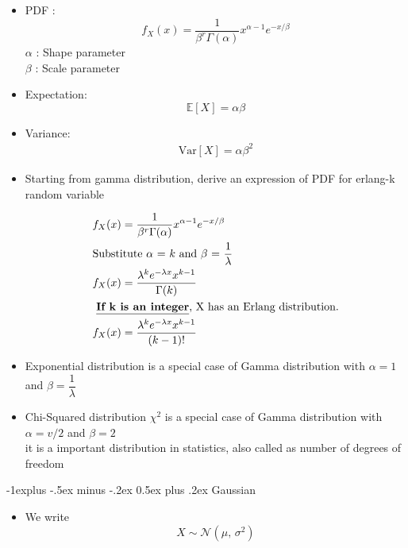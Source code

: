 \documentclass[a4paper]{article}
\makeatletter
\renewcommand{\subsection}{\@startsection{subsection}{2}{0mm}%
                                {-1explus -.5ex minus -.2ex}%
                                {0.5ex plus .2ex}%
                                {\normalfont\normalsize\bfseries}}
\makeatother
\begin{document}
\begin{multicols}{3}
\begin{itemize}
\item PDF :
$$ f_X(x) = \frac{1}{\beta^r \Gamma (\alpha)} x^{\alpha - 1} e^{-x/\beta}
$$
$\alpha$ : Shape parameter\\
$\beta$ : Scale parameter\\







\item Expectation:
$$ \mathbb{E}[X] = \alpha \beta $$

\item Variance:
\begin{align*}
\text{Var}[X] =\alpha \beta^2
\end{align*}


\item Starting from gamma distribution, derive an expression of PDF for erlang-k random variable

\begin{align*}
&f_X(x) = \frac{1}{\beta^r \Gamma (\alpha)} x^{\alpha - 1} e^{-x/\beta}\\
&\text{Substitute $\alpha$ = $k$ and $\beta$ = $\frac{1}{\lambda}$ }\\
 &f_X(x) = \frac{\lambda^k e ^{-\lambda x} x ^{k-1}}{\Gamma(k)}\\
& \text{ \underline{\textbf{If k is an integer}}, X has an Erlang distribution.}\\
& f_X(x) = \frac{\lambda^k e ^{-\lambda x} x ^{k-1}}{(k-1)!}
\end{align*}

\item Exponential distribution is a special case of Gamma distribution with $\alpha = 1$ and $\beta = \dfrac{1}{\lambda}$

\item Chi-Squared distribution $\chi^2$ is a special case of Gamma distribution with $\alpha = v/2$ and $\beta =2$ \\
it is a important distribution in statistics, also called as number of degrees of freedom
\end{itemize}




\subsection{Gaussian} 
\begin{itemize}
\item We write $$X \sim \mathcal{N}(\mu,\,\sigma^{2})$$


\end{itemize}
\end{multicols}
\end{document}
